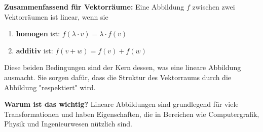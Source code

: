 \textbf{Zusammenfassend für Vektorräume:}
Eine Abbildung $f$ zwischen zwei Vektorräumen ist linear, wenn sie
\begin{enumerate}
    \item \textbf{homogen} ist: $f(\lambda \cdot v) = \lambda \cdot f(v)$
    \item \textbf{additiv} ist: $f(v + w) = f(v) + f(w)$
\end{enumerate}
Diese beiden Bedingungen sind der Kern dessen, was eine lineare Abbildung ausmacht. Sie sorgen dafür, dass die Struktur des Vektorraums durch die Abbildung "respektiert" wird.

\textbf{Warum ist das wichtig?}
Lineare Abbildungen sind grundlegend für viele Transformationen und haben Eigenschaften, die in Bereichen wie Computergrafik, Physik und Ingenieurwesen nützlich sind.